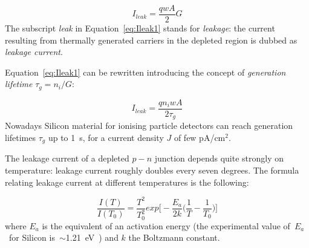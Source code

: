 \begin{equation}
I_{leak}=\dfrac{qwA}{2}G
\label{eq:Ileak1}
\end{equation}
The subscript {\it leak} in Equation~\ref{eq:Ileak1}  stands for {\it leakage}: the current resulting 
from thermally generated carriers in the depleted region is dubbed as {\it leakage current}.

Equation~\ref{eq:Ileak1} can be rewritten introducing the concept of {\it generation lifetime} 
$\tau_g=n_i/G$:

\begin{equation}
I_{leak}=\dfrac{qn_iwA}{2\tau_g}
\label{eq:Ileak2}
\end{equation}
Nowadays Silicon material for ionising particle detectors can reach generation lifetimes  $\tau_g$
up to 1~s, for a current density $J$ of few pA/cm$^2$.

The leakage current of a depleted $p-n$ junction depends quite strongly on temperature: 
leakage current roughly doubles every seven degrees. The formula relating leakage 
current at different temperatures is the following:

\begin{equation}
\dfrac{I(T)}{I(T_0)}=\dfrac{T^2}{T_0^2}exp\Big[-\dfrac{E_a}{2k}\Big(\dfrac{1}{T}-\dfrac{1}{T_0}\Big)\Big]
\label{eq:IleakT}
\end{equation}
where $E_a$ is the equivalent of an activation energy (the experimental value of~$E_a$~for Silicon 
is~$\sim$1.21~eV~\cite{Chilingarov_tscale}) and
$k$ the Boltzmann constant.



